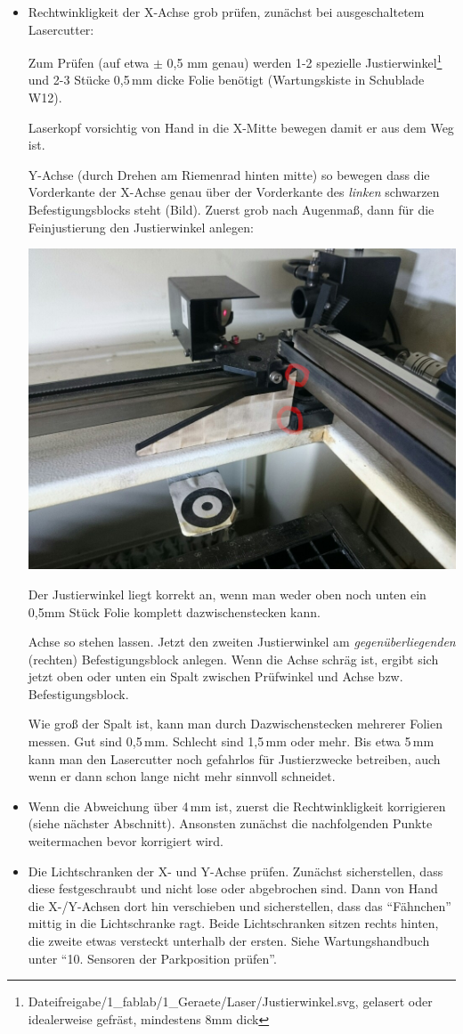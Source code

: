 \documentclass{\basedir/fablab-document}
\begin{document}
\begin{itemize}
		\item Rechtwinkligkeit der X-Achse grob prüfen, zunächst bei ausgeschaltetem Lasercutter:

		Zum Prüfen (auf etwa $\pm$ 0,5 mm genau) werden 1-2 spezielle Justierwinkel\footnote{Dateifreigabe/1\_fablab/1\_Geraete/Laser/Justierwinkel.svg, gelasert oder idealerweise gefräst, mindestens 8mm dick} und 2-3 Stücke 0,5\,mm dicke Folie benötigt (Wartungskiste in Schublade W12).

		Laserkopf vorsichtig von Hand in die X-Mitte bewegen damit er aus dem Weg ist.

		Y-Achse (durch Drehen am Riemenrad hinten mitte) so bewegen dass die Vorderkante der X-Achse genau über der Vorderkante des \emph{linken} schwarzen Befestigungsblocks steht (Bild). Zuerst grob nach Augenmaß, dann für die Feinjustierung den Justierwinkel anlegen:

		\includegraphics[width=.5\linewidth]{img/laserjustierwinkel}

		Der Justierwinkel liegt korrekt an, wenn man weder oben noch unten ein 0,5mm Stück Folie komplett dazwischenstecken kann.

		Achse so stehen lassen. Jetzt den zweiten Justierwinkel am \emph{gegenüberliegenden} (rechten) Befestigungsblock anlegen. Wenn die Achse schräg ist, ergibt sich jetzt oben oder unten ein Spalt zwischen Prüfwinkel und Achse bzw. Befestigungsblock.

		Wie groß der Spalt ist, kann man durch Dazwischenstecken mehrerer Folien messen. Gut sind 0,5\,mm. Schlecht sind 1,5\,mm oder mehr. Bis etwa 5\,mm kann man den Lasercutter noch gefahrlos für Justierzwecke betreiben, auch wenn er dann schon lange nicht mehr sinnvoll schneidet.

		\item Wenn die Abweichung über 4\,mm ist, zuerst die Rechtwinkligkeit korrigieren (siehe nächster Abschnitt). Ansonsten zunächst die nachfolgenden Punkte weitermachen bevor korrigiert wird.

		\item Die Lichtschranken der X- und Y-Achse prüfen. Zunächst sicherstellen, dass diese festgeschraubt und nicht lose oder abgebrochen sind. Dann von Hand die X-/Y-Achsen dort hin verschieben und sicherstellen, dass das \enquote{Fähnchen} mittig in die Lichtschranke ragt. Beide Lichtschranken sitzen rechts hinten, die zweite etwas versteckt unterhalb der ersten. Siehe Wartungshandbuch unter \enquote{10. Sensoren der Parkposition prüfen}.


\end{itemize}
\end{document}
